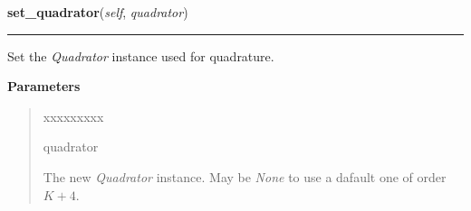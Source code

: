     \label{HagedornWavepacket:HagedornWavepacket:set_quadrator}

    \vspace{0.5ex}

\hspace{.8\funcindent}\begin{boxedminipage}{\funcwidth}

    \raggedright \textbf{set\_quadrator}(\textit{self}, \textit{quadrator})

    \vspace{-1.5ex}

    \rule{\textwidth}{0.5\fboxrule}
\setlength{\parskip}{2ex}
    Set the \textit{Quadrator} instance used for quadrature.

\setlength{\parskip}{1ex}
      \textbf{Parameters}
      \vspace{-1ex}

      \begin{quote}
        \begin{Ventry}{xxxxxxxxx}

          \item[quadrator]

          The new \textit{Quadrator} instance. May be \textit{None} to use
          a dafault one of order $K+4$.

        \end{Ventry}

      \end{quote}

    \end{boxedminipage}

    \label{HagedornWavepacket:HagedornWavepacket:evaluate_base_at}

    \vspace{0.5ex}

